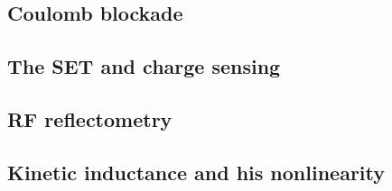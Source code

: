 \documentclass[../main.tex]{subfiles}
\begin{document}
\subsection{Coulomb blockade}

\subsection{The SET and charge sensing}

\subsection{RF reflectometry}

\subsection{Kinetic inductance and his nonlinearity}
\end{document}
